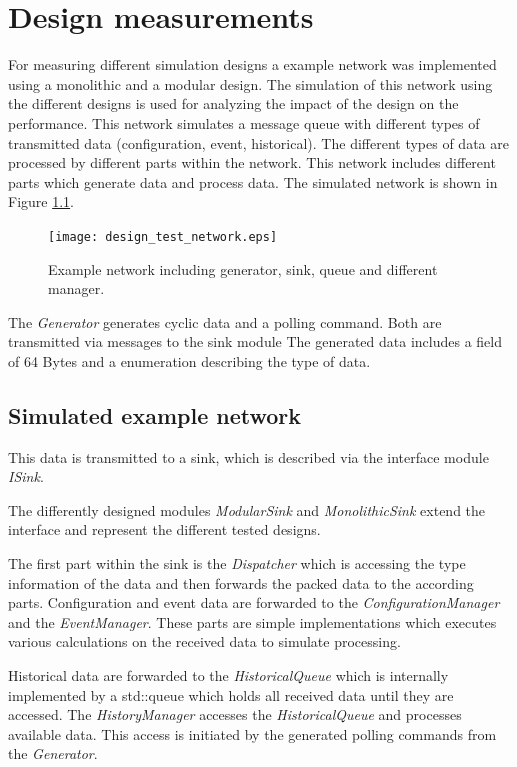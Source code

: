 \chapter{Design measurements}
\label{cha:measurements}
For measuring different simulation designs a example network was implemented using a monolithic and a modular design.
The simulation of this network using the different designs is used for analyzing the impact of the design on the performance.
This network simulates a message queue with different types of transmitted data (configuration, event, historical).
The different types of data are processed by different parts within the network.
This network includes different parts which generate data and process data.
The simulated network is shown in Figure \ref{fig:design_test_network}.

\begin{figure}
    \centering
    \texttt{[image: design\_test\_network.eps]}
    \caption{Example network including generator, sink, queue and different manager.}
    \label{fig:design_test_network}
\end{figure}

The \emph{Generator} generates cyclic data and a polling command.
Both are transmitted via messages to the sink module
The generated data includes a field of 64 Bytes and a enumeration describing the type of data.

\section{Simulated example network}
\label{sec:measurements_network}
This data is transmitted to a sink, which is described via the interface module \emph{ISink}.

The differently designed modules \emph{ModularSink} and \emph{MonolithicSink} extend the interface and represent the different tested designs.

The first part within the sink is the \emph{Dispatcher} which is accessing the type information of the data and then forwards the packed data to the according parts.
Configuration and event data are forwarded to the \emph{ConfigurationManager} and the \emph{EventManager}.
These parts are simple implementations which executes various calculations on the received data to simulate processing.

Historical data are forwarded to the \emph{HistoricalQueue} which is internally implemented by a std::queue which holds all received data until they are accessed.
The \emph{HistoryManager} accesses the \emph{HistoricalQueue} and processes available data.
This access is initiated by the generated polling commands from the \emph{Generator}.
\\

